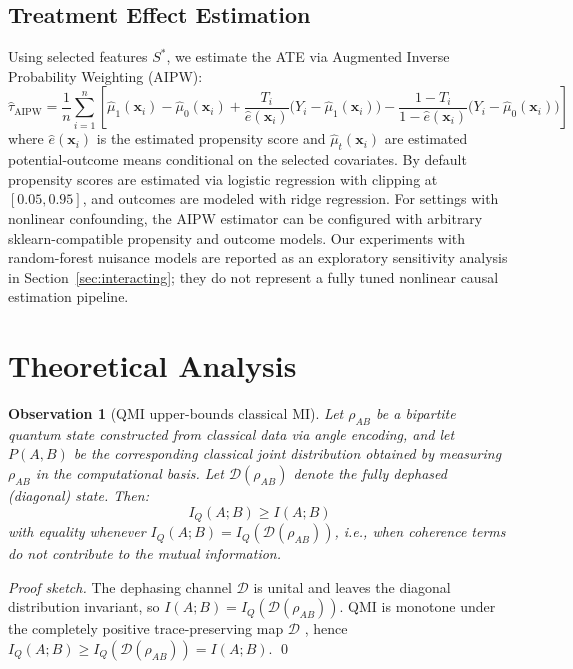 \documentclass{svproc}
\newcommand{\QMI}{I_Q}
\newcommand{\MI}{I}
\newcommand{\D}{\mathcal{D}}
\newtheorem{observation}{Observation}
\begin{document}
\subsection{Treatment Effect Estimation}
\label{subsec:ate}

Using selected features $S^*$, we estimate the ATE via Augmented Inverse Probability Weighting (AIPW):
\begin{equation}
    \label{eq:aipw}
    \hat{\tau}_{\text{AIPW}} = \frac{1}{n}\sum_{i=1}^n \left[\hat{\mu}_1(\mathbf{x}_i) - \hat{\mu}_0(\mathbf{x}_i) + \frac{T_i}{\hat{e}(\mathbf{x}_i)}\bigl(Y_i - \hat{\mu}_1(\mathbf{x}_i)\bigr) - \frac{1-T_i}{1-\hat{e}(\mathbf{x}_i)}\bigl(Y_i - \hat{\mu}_0(\mathbf{x}_i)\bigr)\right]
\end{equation}
where $\hat{e}(\mathbf{x}_i)$ is the estimated propensity score and $\hat{\mu}_t(\mathbf{x}_i)$ are estimated potential-outcome means conditional on the selected covariates. By default propensity scores are estimated via logistic regression with clipping at $[0.05, 0.95]$, and outcomes are modeled with ridge regression. For settings with nonlinear confounding, the AIPW estimator can be configured with arbitrary sklearn-compatible propensity and outcome models. Our experiments with random-forest nuisance models are reported as an exploratory sensitivity analysis in Section~\ref{sec:interacting}; they do not represent a fully tuned nonlinear causal estimation pipeline.

\section{Theoretical Analysis}
\label{sec:theory}

\begin{observation}[QMI upper-bounds classical MI]
\label{obs:qmi_bound}
Let $\rho_{AB}$ be a bipartite quantum state constructed from classical data via angle encoding, and let $P(A,B)$ be the corresponding classical joint distribution obtained by measuring $\rho_{AB}$ in the computational basis. Let $\D(\rho_{AB})$ denote the fully dephased (diagonal) state. Then:
\begin{equation}
    \QMI(A;B) \geq \MI(A;B)
\end{equation}
with equality whenever $\QMI(A;B) = \QMI(\D(\rho_{AB}))$, i.e., when coherence terms do not contribute to the mutual information.
\end{observation}

\textit{Proof sketch.} The dephasing channel $\D$ is unital and leaves the diagonal distribution invariant, so $\MI(A;B) = \QMI(\D(\rho_{AB}))$. QMI is monotone under the completely positive trace-preserving map $\D$ \cite{nielsen2010quantum}, hence $\QMI(A;B) \geq \QMI(\D(\rho_{AB})) = \MI(A;B)$. \qed
\end{document}
